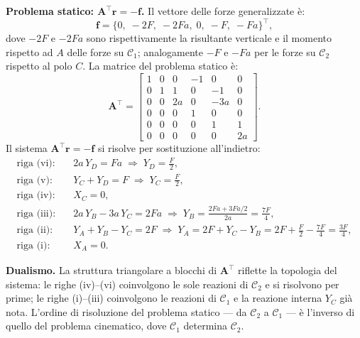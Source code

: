 \begin{esempio}
\begin{svolgimento}
		\smallskip
		\noindent\textbf{Problema statico:
			$\bm{A}^{\top}\bm{r} = -\bm{f}$.}
		Il vettore delle forze generalizzate è:
		\begin{equation*}
			\bm{f} =
			\bigl\{0,\; -2F,\; -2Fa,\;
			0,\; -F,\; -Fa
			\bigr\}^\top,
		\end{equation*}
		dove $-2F$ e $-2Fa$ sono rispettivamente la
		risultante verticale e il momento rispetto ad $A$
		delle forze su $\mathcal{C}_1$; analogamente $-F$ e
		$-Fa$ per le forze su $\mathcal{C}_2$ rispetto al
		polo $C$. La matrice del problema statico è:
		\begin{equation*}\label{eq:B_gerber}
			\bm{A}^{\top} =
			\begin{bmatrix}
				1 &  0 &  0  & -1 &  0  & 0  \\
				0 &  1 &  1  &  0 & -1  & 0  \\
				0 &  0 & 2a  &  0 & -3a & 0  \\
				0 &  0 &  0  &  1 &  0  & 0  \\
				0 &  0 &  0  &  0 &  1  & 1  \\
				0 &  0 &  0  &  0 &  0  & 2a
			\end{bmatrix}.
		\end{equation*}
		Il sistema $\bm{A}^{\top}\bm{r} = -\bm{f}$ si
		risolve per sostituzione all'indietro:
		\begin{align*}
			\text{riga (vi):}&\quad
			2a\,Y_D = Fa
			\;\Longrightarrow\; Y_D = \frac{F}{2},\\
			\text{riga (v):}&\quad
			Y_C + Y_D = F
			\;\Longrightarrow\; Y_C = \frac{F}{2},\\
			\text{riga (iv):}&\quad X_C = 0,\\
			\text{riga (iii):}&\quad
			2a\,Y_B - 3a\,Y_C = 2Fa
			\;\Longrightarrow\;
			Y_B = \frac{2Fa + 3Fa/2}{2a} = \frac{7F}{4},\\
			\text{riga (ii):}&\quad
			Y_A + Y_B - Y_C = 2F
			\;\Longrightarrow\;
			Y_A = 2F + Y_C - Y_B =
			2F + \frac{F}{2} - \frac{7F}{4} = \frac{3F}{4},\\
			\text{riga (i):}&\quad X_A = 0.
		\end{align*}
		
		\noindent\textbf{Dualismo.}
		La struttura triangolare a blocchi di $\bm{A}^\top$
		riflette la topologia del sistema: le righe (iv)--(vi)
		coinvolgono le sole reazioni di $\mathcal{C}_2$ e si
		risolvono per prime; le righe (i)--(iii) coinvolgono
		le reazioni di $\mathcal{C}_1$ e la reazione interna
		$Y_C$ già nota. L'ordine di risoluzione del problema
		statico --- da $\mathcal{C}_2$ a $\mathcal{C}_1$ ---
		è l'inverso di quello del problema cinematico, dove
		$\mathcal{C}_1$ determina $\mathcal{C}_2$.
		

\end{svolgimento}
\end{esempio}
